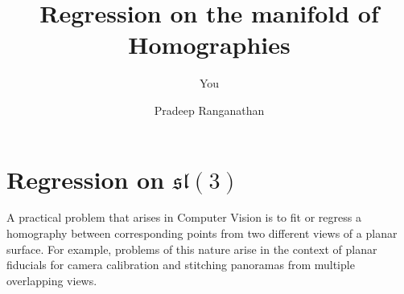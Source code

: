 \documentclass{article}
\title{Regression on the manifold of Homographies}
\author{You}
\begin{document}
\author{Pradeep Ranganathan}
\maketitle




\section{Regression on \(\mathfrak{sl}(3)\)}

A practical problem that arises in Computer Vision is to fit or regress a homography between corresponding points from two different views of a planar surface. For example, problems of this nature arise in the context of planar fiducials for camera calibration and stitching panoramas from multiple overlapping views.






\end{document}
